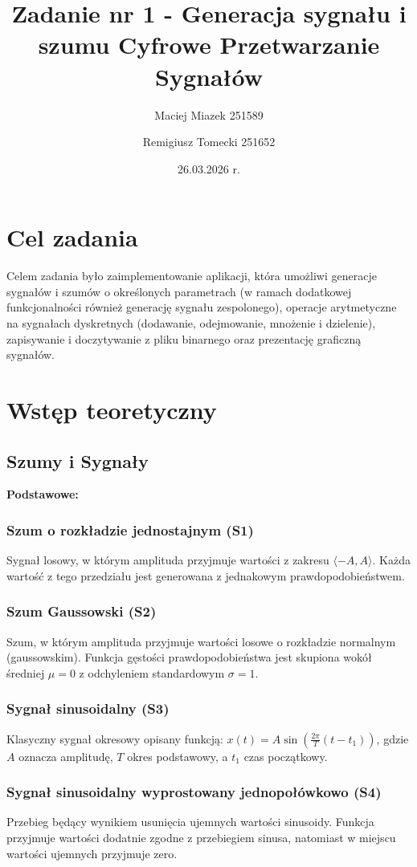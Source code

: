 \documentclass[12pt]{article}
\title{{\bf Zadanie nr 1 - Generacja sygnału i szumu}\linebreak
Cyfrowe Przetwarzanie Sygnałów}
\author{Maciej Miazek 251589 \and Remigiusz Tomecki 251652}
\date{26.03.2026 r.}
\begin{document}
\clearpage\maketitle
\thispagestyle{empty}
\newpage
\setcounter{page}{1}
\section{Cel zadania}
Celem zadania było zaimplementowanie aplikacji, która umożliwi generacje sygnałów i szumów o określonych parametrach (w ramach dodatkowej funkcjonalności również generację sygnału zespolonego), operacje arytmetyczne na sygnałach dyskretnych (dodawanie, odejmowanie, mnożenie i dzielenie), zapisywanie i doczytywanie z pliku binarnego oraz prezentację graficzną sygnałów.\\

\section{Wstęp teoretyczny}
\subsection{Szumy i Sygnały}

\textbf{Podstawowe:}
\subsubsection*{Szum o rozkładzie jednostajnym (S1)}
Sygnał losowy, w którym amplituda przyjmuje wartości z zakresu $\langle-A, A\rangle$. Każda wartość z tego przedziału jest generowana z jednakowym prawdopodobieństwem.

\subsubsection*{Szum Gaussowski (S2)}
Szum, w którym amplituda przyjmuje wartości losowe o rozkładzie normalnym (gaussowskim). Funkcja gęstości prawdopodobieństwa jest skupiona wokół średniej $\mu=0$ z odchyleniem standardowym $\sigma=1$.

\subsubsection*{Sygnał sinusoidalny (S3)}
Klasyczny sygnał okresowy opisany funkcją: $x(t)=A \sin(\frac{2\pi}{T}(t-t_{1}))$, gdzie $A$ oznacza amplitudę, $T$ okres podstawowy, a $t_1$ czas początkowy.

\subsubsection*{Sygnał sinusoidalny wyprostowany jednopołówkowo (S4)}
Przebieg będący wynikiem usunięcia ujemnych wartości sinusoidy. Funkcja przyjmuje wartości dodatnie zgodne z przebiegiem sinusa, natomiast w miejscu wartości ujemnych przyjmuje zero.
\end{document}

